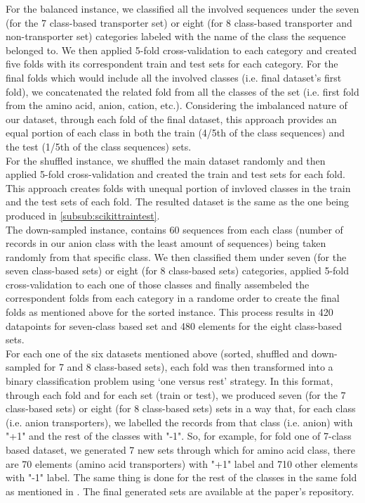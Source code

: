     For the balanced instance, we classified all the involved sequences under the seven (for the 7 class-based transporter set)
    or eight (for 8 class-based transporter and non-transporter set) categories labeled with the name of the class the sequence 
    belonged to. We then applied 5-fold cross-validation to each category and 
    created five folds with its correspondent train and test sets for each category. For the final folds which would include
    all the involved classes (i.e. final dataset's first fold), we concatenated the related fold from all the classes of the set 
    (i.e. first fold from the amino acid, anion, cation, etc.). Considering the imbalanced nature of our dataset, 
    through each fold of the final dataset, this approach provides an equal portion of each class in both the train 
    (4/5th of the class sequences) and the test (1/5th of the class sequences) sets.\\

    For the shuffled instance, we shuffled the main dataset randomly and then applied 5-fold cross-validation and created 
    the train and test sets for each fold. This approach creates folds with unequal portion of invloved classes in  
    the train and the test sets of each fold. The resulted dataset is the same as the one being produced in \ref{subsub:scikittraintest}.\\

    The down-sampled instance, contains 60 sequences from each class (number of records in our anion class with 
    the least amount of sequences) being taken randomly from that specific class. 
    We then classified them under seven (for the seven class-based sets) or eight (for 8 class-based sets) categories, 
    applied 5-fold cross-validation to each one of those classes and finally assembeled the correspondent folds 
    from each category in a randome order to create the final folds as mentioned above for the sorted instance. 
    This process results in 420 datapoints for seven-class based set and 480 elements for the eight class-based sets.\\


    For each one of the six datasets mentioned above (sorted, shuffled and down-sampled for 7 and 8 class-based sets), 
    each fold was then transformed into a binary classification problem using `one versus rest' strategy.
    In this format, through each fold and for each set (train or test), we produced seven (for the 7 class-based sets) 
    or eight (for 8 class-based sets) sets in a way that, for each class (i.e. anion transporters), 
    we labelled the records from that class (i.e. anion) with "+1" and the rest of the classes with "-1". 
    So, for example, for fold one of 7-class based dataset, we generated 7 new sets through which for amino acid class, 
    there are 70 elements (amino acid transporters) with "+1" label and 710 other elements with "-1" label. 
    The same thing is done for the rest of the classes in the same fold as mentioned in \cite{mishra2014prediction}. 
    The final generated sets are available at the paper’s  repository. \\


